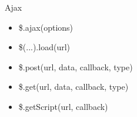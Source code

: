 \begin{frame}{Ajax}
\begin{itemize}
	\pause\item \$.ajax(options)
	\pause\item \$(...).load(url)
	\pause\item \$.post(url, data, callback, type)
	\pause\item \$.get(url, data, callback, type)
	\pause\item \$.getScript(url, callback)
\end{itemize}
\end{frame}
